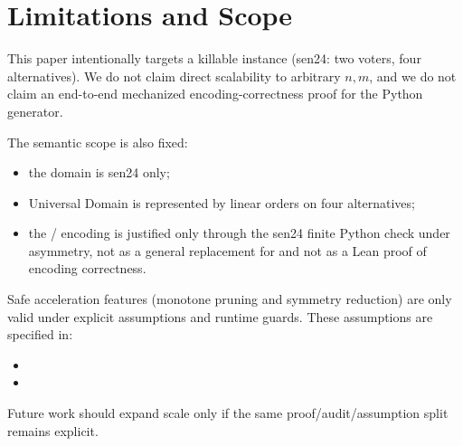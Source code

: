 \section{Limitations and Scope}

This paper intentionally targets a killable instance (sen24: two voters, four alternatives).
We do not claim direct scalability to arbitrary $n,m$, and we do not claim an end-to-end mechanized encoding-correctness proof for the Python generator.

The semantic scope is also fixed:
\begin{itemize}[leftmargin=*]
  \item the domain is sen24 only;
  \item Universal Domain is represented by linear orders on four alternatives;
  \item the / encoding is justified only through the sen24 finite Python check under asymmetry, not as a general replacement for  and not as a Lean proof of encoding correctness.
\end{itemize}

Safe acceleration features (monotone pruning and symmetry reduction) are only valid under explicit assumptions and runtime guards.
These assumptions are specified in:
\begin{itemize}[leftmargin=*]
  \item {}
  \item {}
\end{itemize}

Future work should expand scale only if the same proof/audit/assumption split remains explicit.
